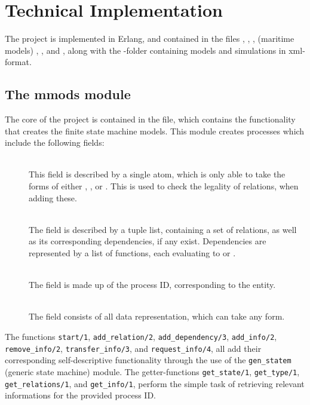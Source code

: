 \section{Technical Implementation}
The project is implemented in Erlang, and contained in the files , , , (maritime models) , , and , along with the -folder containing models and simulations in xml-format.

\subsection{The mmods module}
The core of the project is contained in the  file, which contains the functionality that creates the finite state machine models. This module creates processes which include the following fields:
\begin{description}
  \item[]\ \\
    This field is described by a single atom, which is only able to take the forms of either , , or . This is used to check the legality of relations, when adding these.
  \item[]\ \\
    The  field is described by a tuple list, containing a set of relations, as well as its corresponding dependencies, if any exist. Dependencies are represented by a list of functions, each evaluating to  or .
  \item[]\ \\
    The  field is made up of the process ID, corresponding to the entity.
  \item[]\ \\
    The  field consists of all data representation, which can take any form.
\end{description}
The functions \lstinline{start/1}, \lstinline{add_relation/2}, \lstinline{add_dependency/3}, \lstinline{add_info/2}, \linebreak \lstinline{remove_info/2}, \lstinline{transfer_info/3}, and \lstinline{request_info/4}, all add their corresponding self-descriptive functionality through the use of the \lstinline{gen_statem} (generic state machine) module. The getter-functions \lstinline{get_state/1}, \lstinline{get_type/1}, \lstinline{get_relations/1}, and \lstinline{get_info/1}, perform the simple task of retrieving relevant informations for the provided process ID.


